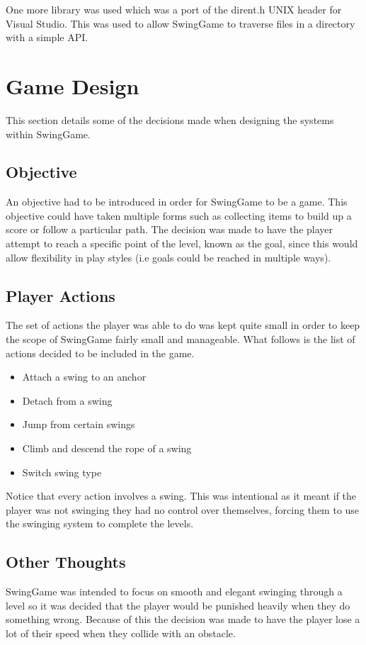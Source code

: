 \documentclass[]{report}
\begin{document}
		One more library was used which was a port of the dirent.h UNIX header for Visual Studio\cite{dirent}. This was used to allow SwingGame to traverse files in a directory with a simple API.
		
	\section{Game Design}
	This section details some of the decisions made when designing the systems within SwingGame.
	\subsection{Objective}
	An objective had to be introduced in order for SwingGame to be a game. This objective could have taken multiple forms such as collecting items to build up a score or follow a particular path. The decision was made to have the player attempt to reach a specific point of the level, known as the goal, since this would allow flexibility in play styles (i.e goals could be reached in multiple ways).
	\subsection{Player Actions}
	The set of actions the player was able to do was kept quite small in order to keep the scope of SwingGame fairly small and manageable. What follows is the list of actions decided to be included in the game.
	\begin{itemize}
		\item{Attach a swing to an anchor}
		\item{Detach from a swing}
		\item{Jump from certain swings}
		\item{Climb and descend the rope of a swing}
		\item{Switch swing type}
	\end{itemize}
	Notice that every action involves a swing. This was intentional as it meant if the player was not swinging they had no control over themselves, forcing them to use the swinging system to complete the levels.
	\subsection{Other Thoughts}
	SwingGame was intended to focus on smooth and elegant swinging through a level so it was decided that the player would be punished heavily when they do something wrong. Because of this the decision was made to have the player lose a lot of their speed when they collide with an obstacle.
	
\end{document}

